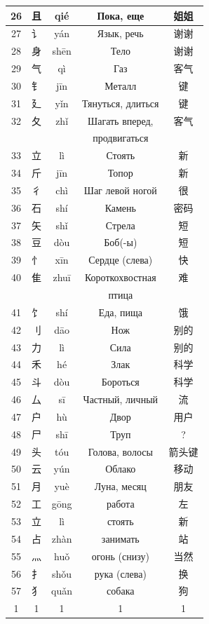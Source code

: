 \begin{center}
\begin{longtable}{||c c c c c||}
		\hline
		26 & 且 & qié & Пока, еще & 姐姐 \\ 
		\hline
		27 & 讠 & yán & Язык, речь & 谢谢 \\ 
		\hline
		28 & 身 & shēn & Тело & 谢谢 \\ 
		\hline
		29 & 气 & qì & Газ & 客气 \\ 
		\hline
		30 & 钅 & jīn & Металл  	& 键 \\ 
		\hline
		31 & 廴 & yǐn & Тянуться, длиться & 键 \\ 
		\hline
		32 & 夂 & zhǐ & Шагать вперед, & 客气 \\ 
		& & & продвигаться & \\ 
		\hline
		33 & 立 & lì & Стоять & 新 \\ 
		\hline
		34 & 斤 & jīn & Топор & 新 \\ 
		\hline
		35 & 彳 & chì & Шаг левой ногой & 很 \\ 
		\hline
		36 & 石 & shí & Камень & 密码 \\ 
		\hline
		37 & 矢 & shǐ & Стрела & 短 \\ 
		\hline
		38 & 豆 & dòu & Боб(-ы) & 短 \\ 
		\hline
		39 & 忄 & xīn & Сердце (слева) & 快 \\ 
		\hline
		40 & 隹 & zhuī & Короткохвостная & 难 \\ 
		& & & птица & \\
		\hline
		41 & 饣 & shí & Еда, пища & 饿 \\ 
		\hline
		42 & 刂 & dāo & Нож & 别的 \\ 
		\hline
		43 & 力 & lì & Сила & 别的 \\ 
		\hline
		44 & 禾 & hé & Злак & 科学 \\ 
		\hline
		45 & 斗 & dòu & Бороться & 科学 \\ 
		\hline
		46 & 厶 & sī & Частный, личный & 流 \\ 
		\hline
		47 & 户 & hù & Двор & 用户 \\ 
		\hline
		48 & 尸 & shī & Труп & ? \\ 
		\hline
		49 & 头 & tóu & Голова, волосы & 箭头键 \\ 
		\hline
		50 & 云 & yún & Облако & 移动 \\ 
		\hline
		51 & 月 & yuè & Луна, месяц & 朋友 \\
		\hline
		52 & 工 & gōng & работа & 左\\
		\hline
		53 & 立 & lì & стоять & 新\\
		\hline
		54 & 占 & zhàn & занимать & 站\\
		\hline
		55 & 灬 & huǒ & огонь (снизу) & 当然\\
		\hline
		56 & 扌 & shǒu & рука (слева) & 换\\
		\hline
		57 & 犭 & quǎn & собака & 狗\\
		1 & 1 & 1 & 1 & 1 \\ [1ex] 
		\hline
	\end{longtable}
\end{center}
